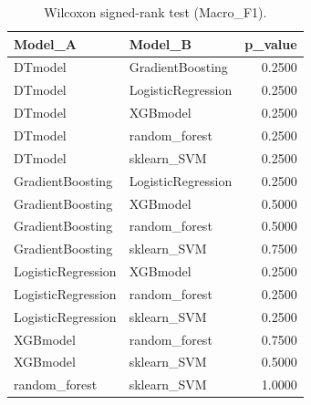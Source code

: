 \begin{table}[t]
\centering
\begin{tabular}{llr}
\toprule
Model_A & Model_B & p_value \\
\midrule
DTmodel & GradientBoosting & 0.2500 \\
DTmodel & LogisticRegression & 0.2500 \\
DTmodel & XGBmodel & 0.2500 \\
DTmodel & random_forest & 0.2500 \\
DTmodel & sklearn_SVM & 0.2500 \\
GradientBoosting & LogisticRegression & 0.2500 \\
GradientBoosting & XGBmodel & 0.5000 \\
GradientBoosting & random_forest & 0.5000 \\
GradientBoosting & sklearn_SVM & 0.7500 \\
LogisticRegression & XGBmodel & 0.2500 \\
LogisticRegression & random_forest & 0.2500 \\
LogisticRegression & sklearn_SVM & 0.2500 \\
XGBmodel & random_forest & 0.7500 \\
XGBmodel & sklearn_SVM & 0.5000 \\
random_forest & sklearn_SVM & 1.0000 \\
\bottomrule
\end{tabular}
\caption{Wilcoxon signed-rank test (Macro_F1).}
\label{tab:wilcoxon_Macro_F1}
\end{table}